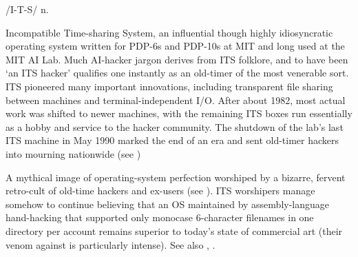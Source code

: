  /I-T-S/ n.

\begin{inparaenum}
	\item Incompatible Time-sharing System, an influential though highly idiosyncratic operating system written for PDP-6s and PDP-10s at
		MIT and long used at the MIT AI Lab. Much AI-hacker jargon derives from ITS folklore, and to have been `an ITS hacker' qualifies
		one instantly as an old-timer of the most venerable sort. ITS pioneered many important innovations, including transparent file
		sharing between machines and terminal-independent I/O. After about 1982, most actual work was shifted to newer machines, with the
		remaining ITS boxes run essentially as a hobby and service to the hacker community. The shutdown of the lab's last ITS machine in
		May 1990 marked the end of an era and sent old-timer hackers into mourning nationwide (see )
	\item A mythical image of operating-system perfection worshiped by a bizarre, fervent retro-cult of old-time hackers and ex-users (see
		). ITS worshipers manage somehow to continue believing that an OS maintained by assembly-language
		hand-hacking that supported only monocase 6-character filenames in one directory per account remains superior to today's state of
		commercial art (their venom against  is particularly intense). See also , .
\end{inparaenum}

